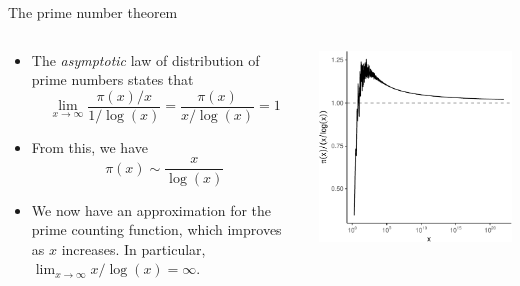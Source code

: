 \documentclass[,aspectratio=169]{beamer}
\begin{document}
\begin{frame}{The prime number theorem}
\protect\hypertarget{the-prime-number-theorem}{}
\begin{columns}[T]
\begin{column}{0.49\textwidth}
\begin{itemize}
\item
  The \emph{asymptotic} law of distribution of prime numbers states that
  \[
  \lim_{x\to\infty} \frac{\pi(x)/x}{1 / \log(x)} = \frac{\pi(x)}{x/\log(x)} = 1
  \]
\item
  From this, we have \[
  \pi(x) \sim \frac{x}{\log(x)}
  \]
\item
  We now have an approximation for the prime counting function, which
  improves as \(x\) increases. In particular,
  \(\lim_{x\to\infty} x / \log (x) = \infty\).
\end{itemize}
\end{column}

\begin{column}{0.49\textwidth}
\includegraphics{figure/unnamed-chunk-5-1.pdf}
\end{column}
\end{columns}
\end{frame}
\end{document}
